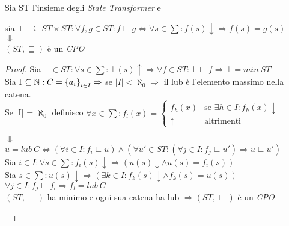 \begin{esercizio}
  Sia ST l'insieme degli \emph{State Transformer} e
  \begin{center}
    sia $\sqsubseteq\ \subseteq ST \times ST :
    \forall f,g \in ST : f \sqsubseteq g \Longleftrightarrow \forall s \in \sum :
    f(s)\downarrow \Rightarrow f(s) = g(s)$\\
    $\Downarrow$\\
    $(ST, \sqsubseteq)$ è un \emph{CPO}
  \end{center}
  \begin{proof}
    Sia $\bot \in ST : \forall s \in \sum : \bot(s)\uparrow \Rightarrow \forall f \in ST : \bot \sqsubseteq f \Rightarrow \bot = min\ ST $\\
    Sia I $\subseteq \mathbb{N} : C = \left\{a_i\right\}_{i \in I} \Rightarrow$ se $|I| < \aleph_0 \Rightarrow$ il lub è l'elemento massimo nella catena.\\
    Se |I| = $\aleph_0$ definisco $\forall x \in \sum : f_l(x) =
    \begin{cases}
      f_h(x) & \text{se } \exists h \in I : f_h(x)\downarrow
      \\
      \uparrow & \text{altrimenti}
    \end{cases} $
    \begin{center}
      $\Downarrow$\\
      $u = lub\ C \Longleftrightarrow (\forall i \in I : f_i \sqsubseteq u) \land (\forall u' \in ST : (\forall j \in I : f_j \sqsubseteq u') \Rightarrow u \sqsubseteq u')$\\
      Sia $i \in I : \forall s \in \sum : f_i(s)\downarrow \Rightarrow (u(s)\downarrow \land u(s)=f_i(s))$\\
      Sia $s \in \sum : u(s)\downarrow \Rightarrow (\exists k \in I : f_k(s)\downarrow \land f_k(s)=u(s))$\\
      $\forall j \in I : f_j \sqsubseteq f_l \Rightarrow f_l = lub\ C$\\
      $(ST, \sqsubseteq)$ ha minimo e ogni sua catena ha lub $\Rightarrow (ST, \sqsubseteq)$ è un \emph{CPO}
    \end{center}
  \end{proof}
\end{esercizio}


